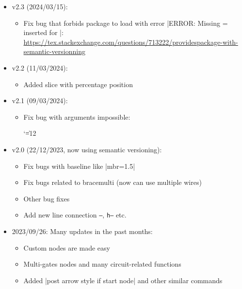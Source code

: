 \documentclass[a4paper,doc2]{ltxdoc} %
\begin{document}
\begin{itemize}
\item v2.3 (2024/03/15):
  \begin{itemize}
  \item Fix bug that forbids package to load with error |ERROR: Missing = inserted for \ifnum|: \url{https://tex.stackexchange.com/questions/713222/providespackage-with-semantic-versionning}
  \end{itemize}
\item v2.2 (11/03/2024):
  \begin{itemize}
  \item Added slice with percentage position
  \end{itemize}
\item v2.1 (09/03/2024):
  \begin{itemize}
  \item Fix bug with arguments impossible:
    {\catcode`\|=12 %
    \begin{codeexample}[vbox]
    \end{codeexample}}
  \end{itemize}
\item v2.0 (22/12/2023, now using semantic versioning):
  \begin{itemize}
  \item Fix bugs with baseline like |mbr=1.5|
  \item Fix bugs related to bracemulti (now can use multiple wires)
  \item Other bug fixes
  \item Add new line connection \texttt{--\textbar}, \texttt{h--\textbar} etc.
  \end{itemize}
\item 2023/09/26:
  Many updates in the past months:
  \begin{itemize}
  \item Custom nodes are made easy
  \item Multi-gates nodes and many circuit-related functions
  \item Added |post arrow style if start node| and other similar commands

\end{itemize}
\end{itemize}
\end{document}
